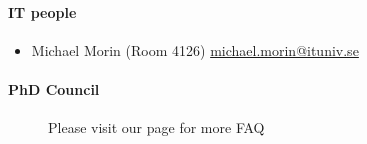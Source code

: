 \documentclass[acmtog]{acmart}
\begin{document}
\paragraph{IT people}
\begin{itemize}
\item Michael Morin (Room 4126) \url{michael.morin@ituniv.se}
\end{itemize}
\paragraph{PhD Council}


\begin{figure}
  \begin{center}
    \caption{Please visit our page for more FAQ}
    \end{center}
\end{figure}




\end{document}
